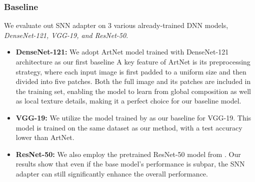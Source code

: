 \subsubsection{Baseline}We evaluate out SNN adapter on 3 various already-trained DNN models, \textit{DenseNet-121, VGG-19, and ResNet-50}. 
\begin{itemize}
    \item \textbf{DenseNet-121:} We adopt ArtNet model\cite{artnet} trained with DenseNet-121 architecture as our first baseline A key feature of ArtNet is its preprocessing
strategy, where each input image is first padded to a uniform
size and then divided into five patches. Both the full image
and its patches are included in the training set, enabling the
model to learn from global composition as well as local texture details, making it 
a perfect choice for our baseline model.
\item \textbf{VGG-19:} We utilize the model trained by \cite{qchaldemer2023paintingclassification} as our baseline for VGG-19. This model is trained on the same dataset as our method, with a test accuracy lower than ArtNet.
\item \textbf{ResNet-50:} We also employ the pretrained ResNet-50 model from \cite{kayracoskun2023artstyleclassification}. Our results show that even if the base model's performance is subpar, the SNN adapter can still significantly enhance the overall performance.
\end{itemize}
